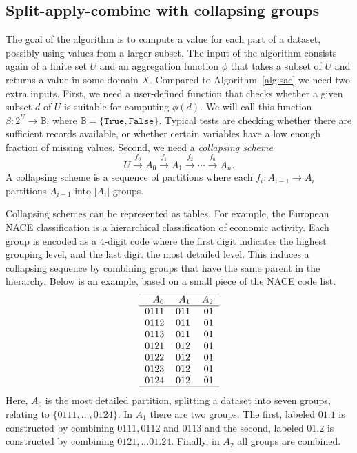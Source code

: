 \documentclass[11pt, fleqn]{article}
\begin{document}
\subsection{Split-apply-combine with collapsing groups}
\label{sect:saccg}
The goal of the algorithm is to compute a value for each part of a dataset,
possibly using values from a larger subset. The input of the algorithm consists
again of a finite set $U$ and an aggregation function $\phi$ that takes a subset
of $U$ and returns a value in some domain $X$.  Compared to
Algorithm~\ref{alg:sac} we need two extra inputs. First, we need a user-defined
function that checks whether a given subset $d$ of $U$ is suitable for
computing $\phi(d)$.  We will call this function $\beta: 2^U\to \mathbb{B}$,
where $\mathbb{B}=\{\texttt{True},\texttt{False}\}$.  Typical tests are
checking whether there are sufficient records available, or whether certain
variables have a low enough fraction of missing values. Second, we need a
\emph{collapsing scheme}
\begin{equation}
U\xrightarrow{f_0}A_0\xrightarrow{f_1}A_1\xrightarrow{f_2}\cdots\xrightarrow{f_n}A_n.
\label{eq:collapsingsequence}
\end{equation}
A collapsing scheme is a sequence of partitions where each $f_i:A_{i-1}\to A_i$
partitions $A_{i-1}$ into $|A_i|$ groups. 

Collapsing schemes can be represented as tables. For example, the European NACE
classification is a hierarchical classification of economic activity. Each
group is encoded as a 4-digit code where the first digit indicates the highest
grouping level, and the last digit the most detailed level. This induces a
collapsing sequence by combining groups that have the same parent in the
hierarchy. Below is an example, based on a small piece of the NACE code list.
%
\begin{equation}
\begin{tabular}{rrr}
\hline
 $A_0$& $A_1$ & $A_2$\\
\hline
0111&   011 & 01\\
0112&   011 & 01\\
0113&   011 & 01\\
0121&   012 & 01\\
0122&   012 & 01\\
0123&   012 & 01\\
0124&   012 & 01\\
\hline
\end{tabular}
\label{eq:tablerep}
\end{equation}
Here, $A_0$ is the most detailed partition, splitting a dataset into seven
groups, relating to $\{0111,\ldots,0124\}$. In $A_1$ there are two groups.
The first, labeled $01.1$ is constructed by combining $0111, 0112$ and
$0113$ and the second, labeled $01.2$ is constructed by combining
$0121,\ldots 01.24$. Finally, in $A_2$ all groups are combined.
\end{document}
